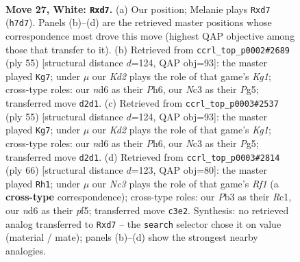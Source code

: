 \documentclass[11pt]{article}
\begin{document}
\clearpage

\begin{figure}[p]\centering
\begin{subfigure}{0.46\textwidth}\centering
\resizebox{\linewidth}{!}{%
\newchessgame
\chessboard[
  setfen={r2qkb2/3n3R/2Qn2p1/2pP4/4P3/1PN5/P2K4/8 w - - 2 27},
  showmover=false,
  pgfstyle=straightmove, color=movearrow, markmove={h7-d7}
]}
\caption{}
\end{subfigure}\hfill
\begin{subfigure}{0.46\textwidth}\centering
\resizebox{\linewidth}{!}{%
\newchessgame
\chessboard[
  setfen={5rk1/1p6/p2pp2p/4q1p1/4B3/3Q3P/P4PK1/2rNR3 b - - 1 28},
  showmover=false,
  pgfstyle=straightmove, color=movearrow, markmove={g8-g7}
]}
\caption{}
\end{subfigure}
\\[4pt]
\begin{subfigure}{0.46\textwidth}\centering
\resizebox{\linewidth}{!}{%
\newchessgame
\chessboard[
  setfen={5rk1/1p6/p2pp2p/4q1p1/4B3/3Q3P/P4PK1/2rNR3 b - - 1 28},
  showmover=false,
  pgfstyle=straightmove, color=movearrow, markmove={g8-g7}
]}
\caption{}
\end{subfigure}\hfill
\begin{subfigure}{0.46\textwidth}\centering
\resizebox{\linewidth}{!}{%
\newchessgame
\chessboard[
  setfen={3k3r/p3qn2/2pb4/5p2/1P1Q1P2/P3P3/6K1/2R2R2 w - - 0 34},
  showmover=false,
  pgfstyle=straightmove, color=movearrow, markmove={f1-h1}
]}
\caption{}
\end{subfigure}
\caption{\textbf{Move 27, White: \texttt{Rxd7}.} (a) Our position; Melanie plays \texttt{Rxd7} (\texttt{h7d7}). Panels (b)--(d) are the retrieved master positions whose correspondence most drove this move (highest QAP objective among those that transfer to it). (b) Retrieved from \texttt{ccrl\_top\_p0002\#2689} (ply 55) [structural distance $d$=124, QAP obj=93]: the master played \texttt{Kg7}; under $\mu$ our \emph{Kd2} plays the role of that game's \emph{Kg1}; cross-type roles: our \emph{n}d6 as their \emph{P}h6, our \emph{N}c3 as their \emph{P}g5; transferred move \texttt{d2d1}. (c) Retrieved from \texttt{ccrl\_top\_p0003\#2537} (ply 55) [structural distance $d$=124, QAP obj=93]: the master played \texttt{Kg7}; under $\mu$ our \emph{Kd2} plays the role of that game's \emph{Kg1}; cross-type roles: our \emph{n}d6 as their \emph{P}h6, our \emph{N}c3 as their \emph{P}g5; transferred move \texttt{d2d1}. (d) Retrieved from \texttt{ccrl\_top\_p0003\#2814} (ply 66) [structural distance $d$=123, QAP obj=80]: the master played \texttt{Rh1}; under $\mu$ our \emph{Nc3} plays the role of that game's \emph{Rf1} (a \textbf{cross-type} correspondence); cross-type roles: our \emph{P}b3 as their \emph{R}c1, our \emph{n}d6 as their \emph{p}f5; transferred move \texttt{c3e2}. Synthesis: no retrieved analog transferred to \texttt{Rxd7} -- the \texttt{search} selector chose it on value (material / mate); panels (b)--(d) show the strongest nearby analogies.}
\label{fig:thought-m52}
\end{figure}
\end{document}
